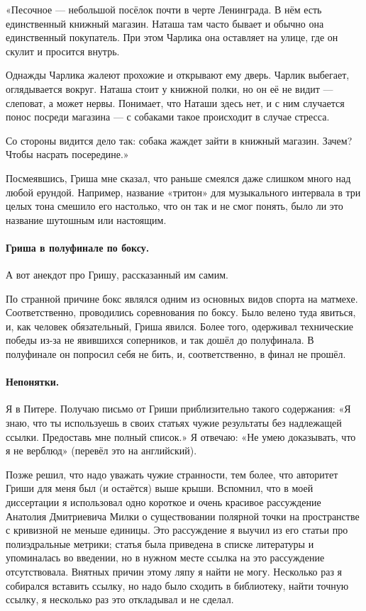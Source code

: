 \documentclass{book}
\begin{document}
«Песочное --- небольшой посёлок почти в черте Ленинграда.
В нём есть единственный книжный магазин.
Наташа там часто бывает и обычно она единственный покупатель.
При этом Чарлика она оставляет на улице, где он скулит и просится внутрь.

Однажды Чарлика жалеют прохожие и открывают ему дверь.
Чарлик выбегает, оглядывается вокруг.
Наташа стоит у книжной полки, но он её не видит --- слеповат, а может нервы.
Понимает, что Наташи здесь нет, и с ним случается понос посреди магазина --- с собаками такое происходит в случае стресса.

Со стороны видится дело так: собака жаждет зайти в книжный магазин.
Зачем?
Чтобы насрать посередине.»

Посмеявшись, Гриша мне сказал, что раньше смеялся даже слишком много над любой ерундой.
Например, название «тритон» для музыкального интервала в три целых тона смешило его настолько, что он так и не смог понять, было ли это название шутошным или настоящим.

\paragraph{Гриша в полуфинале по боксу.} А вот анекдот про Гришу, рассказанный им самим.

По странной причине бокс являлся одним из основных видов спорта на матмехе.
Соответственно, проводились соревнования по боксу.
Было велено туда явиться, и, как человек обязательный, Гриша явился.
Более того, одерживал технические победы из-за не явившихся соперников, и так дошёл до полуфинала.
В полуфинале он попросил себя не бить, и, соответственно, в финал не прошёл.

\paragraph{Непонятки.}
Я в Питере.
Получаю письмо от Гриши приблизительно такого содержания:
«Я знаю, что ты используешь в своих статьях чужие результаты без надлежащей ссылки.
Предоставь мне полный список.»
Я отвечаю: «Не умею доказывать, что я не верблюд» (перевёл это на английский).

Позже решил, что надо уважать чужие странности, тем более, что авторитет Гриши для меня был (и остаётся) выше крыши.
Вспомнил, что в моей диссертации
я использовал одно короткое и очень красивое рассуждение Анатолия Дмитриевича Милки о существовании полярной точки на пространстве с кривизной не меньше единицы.
Это рассуждение я выучил из его статьи про полиэдральные метрики; статья была приведена в списке литературы и упоминалась во введении, но в нужном месте ссылка на это рассуждение отсутствовала.
Внятных причин этому ляпу я найти не могу.
Несколько раз я собирался вставить ссылку, но надо было сходить в библиотеку, найти точную ссылку, я несколько раз это откладывал и не сделал.
\end{document}
